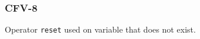 \subsubsection{CFV-8}\label{sec:error_code_cfv_8}

Operator \texttt{reset} used on variable that does not exist.


